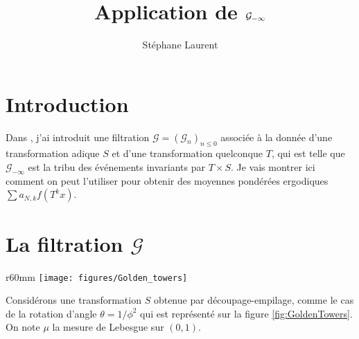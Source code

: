 \documentclass[12pt,a4paper]{article}
\author{Stéphane Laurent}
\title{Application de $\GG_{-\infty}$}
\begin{document}
\theoremstyle{defstyle}
\newtheorem{definition}{Definition}
\newtheorem{remark}{Remark}
\newtheorem{question}{Question}
\newtheorem{clarify}{To clarify}
\theoremstyle{thmstyle}
\newtheorem{thm}{Theorem}[section]
\newtheorem{ppsition}{Proposition}
\newtheorem{lemma}{Lemma}

\newcommand{\FF}{\mathcal{F}}
\newcommand{\GG}{\mathcal{G}}
\newcommand{\EE}{\mathbb{E}}
\newcommand{\II}{\mathcal{I}}
\newcommand{\LL}{\mathcal{L}}
\newcommand{\OO}{\mathcal{O}}
\newcommand{\XX}{\mathcal{X}}
\newcommand{\N}{\mathbb{N}}
\newcommand{\Z}{\mathbb{Z}}

\newcommand{\given}{\mid}
\newcommand{\eps}{\epsilon}
\newcommand{\indic}{\boldsymbol 1}
\newcommand{\Vb}{\boldsymbol V}

\newcommand{\indvee}{\dot{\vee}}
\newcommand{\indep}{\mathrel{\text{\scalebox{1.07}{$\perp\mkern-10mu\perp$}}}}

\maketitle


\section{Introduction}

Dans \cite{LauScale}, j'ai introduit une filtration $\GG={(\GG_n)}_{n \leq 0}$ 
associée à la donnée d'une transformation adique $S$ et d'une transformation 
quelconque $T$, qui est telle que $\GG_{-\infty}$ est la tribu des 
événements invariants par $T \times S$. 
Je vais montrer ici comment on peut l'utiliser pour obtenir 
des moyennes pondérées ergodiques $\sum a_{N,k} f(T^k x)$.
 

\section{La filtration $\GG$}


\begin{wrapfigure}{r}{60mm}
   \centering
   	\texttt{[image: figures/Golden\_towers]}
   \caption{Golden towers}
   \label{fig:GoldenTowers}
\end{wrapfigure}
Considérons une transformation $S$ obtenue par découpage-empilage, 
comme le cas de la rotation d'angle $\theta=1/\phi^2$ qui 
est représenté sur la figure \ref{fig:GoldenTowers}. 
On note $\mu$ la mesure de Lebesgue sur $(0,1)$. 
\end{document}

